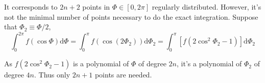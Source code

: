 It corresponds to $2n+2$ points in $\Phi\in\left[0,2\pi\right]$
regularly distributed. However, it's not the minimal number of points
necessary to do the exact integration. Suppose that $\Phi_{2}\equiv\Phi/2$,
\begin{equation}
\int_{0}^{2\pi}f(\cos\Phi)\mathrm{d}\Phi=\int_{0}^{\pi}f(\cos(2\Phi_{2}))\mathrm{d}\Phi_{2}=\int_{0}^{\pi}\left[f(2\cos^{2}\Phi_{2}-1)\right]\mathrm{d}\Phi_{2}
\end{equation}

As $f(2\cos^{2}\Phi_{2}-1)$ is a polynomial of $\Phi$ of degree
$2n$, it's a polynomial of $\Phi_{2}$ of degree $4n$. Thus only
$2n+1$ points are needed.
